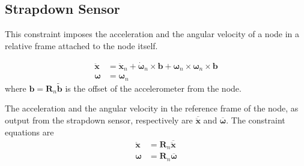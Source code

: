 \documentclass[10pt,dvips,fleqn,subeqn]{report}
\newcommand{\T}[1]{\bm{#1}}
\newcommand{\TT}[1]{\bm{#1}}
\begin{document}
\begin{comment}
\paragraph{Physics.}
In other words, node 1 is the screw and node 2 is the bolt;
neglecting the offset, the force along the screw axis is related
to the couple about the same axis by the relationship
\begin{equation}
	C = - \frac{p}{2\pi} F
\end{equation}
which results from a power balance
\begin{equation}
	C \omega_r + F v_r = 0
\end{equation}
in terms of relative linear ($v_r$) and angular ($\omega_r$) velocity,
with the kinematic relationship
\begin{equation} 
	v_r = \frac{p}{2\pi} \omega_r
\end{equation}

A foreseen improvement consists in adding friction based on empirical
formulas for screws.
\end{comment}




\subsection{Strapdown Sensor}
This constraint imposes the acceleration and the angular velocity
of a node in a relative frame attached to the node itself.

\begin{subequations}
\begin{align}
	\ddot{\T{x}}
	&=
	\ddot{\T{x}}_n
	+
	\dot{\T{\omega}}_n \times \T{b}
	+
	\T{\omega}_n \times \T{\omega}_n \times \T{b}
	\\
	\T{\omega}
	&=
	\T{\omega}_n
\end{align}
\end{subequations}
where $\T{b} = \TT{R}_n \tilde{\T{b}}$ is the offset of the accelerometer
from the node.

The acceleration and the angular velocity in the reference frame
of the node, as output from the strapdown sensor, respectively are
$\overline{\ddot{\T{x}}}$ and $\overline{\T{\omega}}$.
The constraint equations are
\begin{subequations}
\begin{align}
	\ddot{\T{x}}
	&=
	\TT{R}_n \overline{\ddot{\T{x}}}
	\\
	\T{\omega}
	&=
	\TT{R}_n \overline{\T{\omega}}
\end{align}
\end{subequations}
\end{document}
